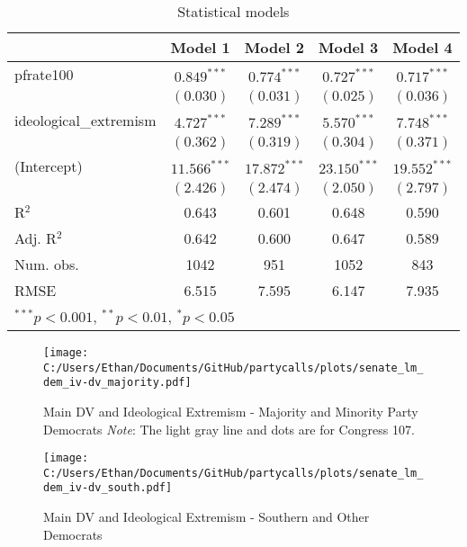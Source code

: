 \documentclass[12pt]{article}
\begin{document}
\begin{table}
	\begin{center}
		\begin{tabular}{l c c c c }
			\hline
			& Model 1 & Model 2 & Model 3 & Model 4 \\
			\hline
			pfrate100              & $0.849^{***}$  & $0.774^{***}$  & $0.727^{***}$  & $0.717^{***}$  \\
			& $(0.030)$      & $(0.031)$      & $(0.025)$      & $(0.036)$      \\
			ideological\_extremism & $4.727^{***}$  & $7.289^{***}$  & $5.570^{***}$  & $7.748^{***}$  \\
			& $(0.362)$      & $(0.319)$      & $(0.304)$      & $(0.371)$      \\
			(Intercept)            & $11.566^{***}$ & $17.872^{***}$ & $23.150^{***}$ & $19.552^{***}$ \\
			& $(2.426)$      & $(2.474)$      & $(2.050)$      & $(2.797)$      \\
			\hline
			R$^2$                  & 0.643          & 0.601          & 0.648          & 0.590          \\
			Adj. R$^2$             & 0.642          & 0.600          & 0.647          & 0.589          \\
			Num. obs.              & 1042           & 951            & 1052           & 843            \\
			RMSE                   & 6.515          & 7.595          & 6.147          & 7.935          \\
			\hline
			\multicolumn{5}{l}{\scriptsize{$^{***}p<0.001$, $^{**}p<0.01$, $^*p<0.05$}}
		\end{tabular}
		\caption{Statistical models}
	\end{center}
\end{table}

\begin{figure}[h]
	\caption{Main DV and Ideological Extremism - Majority and Minority Party Democrats \textit{Note}: The light gray line and dots are for Congress 107.}
	\texttt{[image: C:/Users/Ethan/Documents/GitHub/partycalls/plots/senate\_lm\_dem\_iv-dv\_majority.pdf]}
\end{figure}

\begin{figure}[h]
	\caption{Main DV and Ideological Extremism - Southern and Other Democrats}
	\texttt{[image: C:/Users/Ethan/Documents/GitHub/partycalls/plots/senate\_lm\_dem\_iv-dv\_south.pdf]}
\end{figure}
\end{document}
